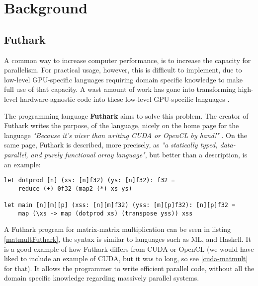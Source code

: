 \section{Background}
\subsection{Futhark}
A common way to increase computer performance, is to increase the capacity for parallelism. For practical usage, however, this is difficult to implement, due to low-level GPU-specific languages requiring domain specific knowledge to make full use of that capacity. A wast amount of work has gone into transforming high-level hardware-agnostic code into these low-level GPU-specific languages \cite{inc-flat}. 

The programming language \textbf{Futhark} aims to solve this problem. The creator of Futhark writes the purpose, of the language, nicely on the home page for the language \textit{"Because it’s nicer than writing CUDA or OpenCL by hand!"} \cite{futhark-home}. On the same page, Futhark is described, more precisely, as \textit{"a statically typed, data-parallel, and purely functional array language"}, but better than a description, is an example:
\begin{center}
\lstset{language=haskell}
\begin{lstlisting}
let dotprod [n] (xs: [n]f32) (ys: [n]f32): f32 =
	reduce (+) 0f32 (map2 (*) xs ys)

let main [n][m][p] (xss: [n][m]f32) (yss: [m][p]f32): [n][p]f32 =
	map (\xs -> map (dotprod xs) (transpose yss)) xss
\end{lstlisting}%
\label{matmultFuthark}
\end{center}
A Futhark program for matrix-matrix multiplication can be seen in listing \ref{matmultFuthark}, the syntax is similar to languages such as ML, and Haskell. It is a good example of how Futhark differs from CUDA or OpenCL (we would have liked to include an example of CUDA, but it was to long, so see \ref{cuda-matmult} for that). It allows the programmer to write efficient parallel code, without all the domain specific knowledge regarding massively parallel systems. 

